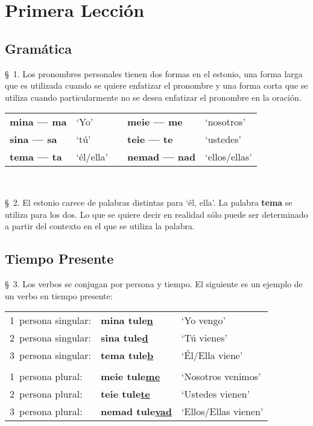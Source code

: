 
\chapter{Primera Lección} %

\label{ch:lesson01} %


\section{\Large{Gramática}}

\S\ 1. Los pronombres personales tienen dos formas en el estonio, una forma larga que es utilizada cuando se quiere enfatizar el pronombre y una forma corta que se utiliza cuando particularmente no se desea enfatizar el pronombre en la oración.\\

\begin{tabular}{ l l c l l }
	\textbf{mina — ma} & `Yo'		& &	\textbf{meie — me} 	& `nosotros' \\
	\textbf{sina — sa} & `tú'		& &	\textbf{teie — te}	& `ustedes' \\
	\textbf{tema — ta} & `él/ella'	& &	\textbf{nemad — nad}&`ellos/ellas'
\end{tabular}\\ \bigskip

\S\ 2. El estonio carece de palabras distintas para `él, ella'. La palabra \textbf{tema} se utiliza para los dos. Lo que se quiere decir en realidad sólo puede ser determinado a partir del contexto en el que se utiliza la palabra.\\

\section{\Large{Tiempo Presente}}

\S\ 3. Los verbos se conjugan por persona y tiempo. El siguiente es un ejemplo de un verbo en tiempo presente:\\

\begin{tabular}{ l l l }
	1\textordmasculine\ persona singular: 	& \textbf{mina tule\underline{n}} 		& `Yo vengo' \\
	2\textordmasculine\ persona singular: 	& \textbf{sina tule\underline{d}} 		& `Tú vienes' \\
	3\textordmasculine\ persona singular: 	& \textbf{tema tule\underline{b}} 		& `Él/Ella viene' \\
	 & & \\
	1\textordmasculine\ persona plural:		& \textbf{meie tule\underline{me}} 		& `Nosotros venimos' \\
	2\textordmasculine\ persona plural:		& \textbf{teie tule\underline{te}} 		& `Ustedes vienen' \\
	3\textordmasculine\ persona plural:		& \textbf{nemad tule\underline{vad}} 	& `Ellos/Ellas vienen'
\end{tabular}\\ \bigskip

